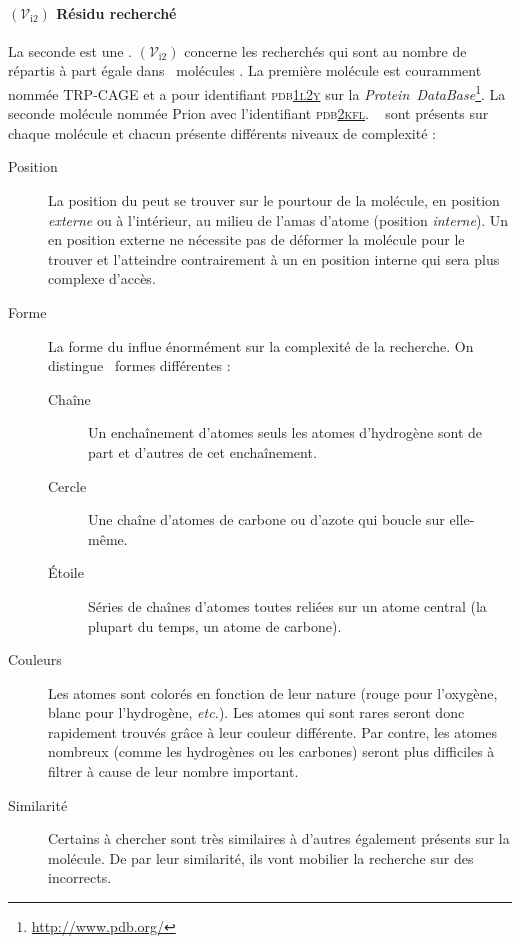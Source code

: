 \documentclass[myfrancais]{mythesis}
\newcommand{\mynum}[1]{\nombre{#1}}
\newcommand{\myvar}[2]{$\left(\mathcal{V}_{\mathrm{#1}#2}\right)$\xspace}
\newcommand{\myvari}[1]{\myvar{i}{#1}}
\newcommand{\myPDB}{\textsc{pdb}\xspace}
\newcommand{\myPDBbase}{\emph{Protein~DataBase}\xspace}
\newcommand{\myPDBlink}[2]{\href{#1}{\textsc{\MakeLowercase{#2}}}}
\newcommand{\TRPCAGE}{TRP-CAGE\xspace}
\newcommand{\Prion}{Prion\xspace}
\newcommand{\myemph}[1]{\emph{#1}}
\newcommand{\myetc}{\textit{etc.}\xspace}
\begin{document}
	\paragraph{\myvari{2} Résidu recherché}
	La seconde  est une .
	\myvari{2} concerne les  recherchés qui sont au nombre de \mynum{10} répartis à part égale dans \mynum{2}~molécules .
	La première molécule est couramment nommée \TRPCAGE {} et a pour identifiant \myPDB \myPDBlink{http://www.rcsb.org/pdb/explore/explore.do?structureId=1L2Y}{1L2Y} sur la \myPDBbase\footnote{\url{http://www.pdb.org/}}.
	La seconde molécule nommée \Prion {} avec l'identifiant \myPDB \myPDBlink{http://www.rcsb.org/pdb/explore/explore.do?structureId=2KFL}{2KFL}.
	\mynum{5}~ sont présents sur chaque molécule  et chacun présente différents niveaux de complexité  :
	\begin{description}
		\item[Position] La position du  peut se trouver sur le pourtour de la molécule, en position \myemph{externe} ou à l'intérieur, au milieu de l'amas d'atome (position \myemph{interne}).
			Un  en position externe ne nécessite pas de déformer la molécule pour le trouver et l'atteindre contrairement à un  en position interne qui sera plus complexe d'accès.
		\item[Forme] La forme du  influe énormément sur la complexité de la recherche.
			On distingue \mynum{3}~formes différentes :
			\begin{description}
				\item[Chaîne] Un enchaînement d'atomes seuls les atomes d'hydrogène sont de part et d'autres de cet enchaînement.
				\item[Cercle] Une chaîne d'atomes de carbone ou d'azote qui boucle sur elle-même.
				\item[Étoile] Séries de chaînes d'atomes toutes reliées sur un atome central (la plupart du temps, un atome de carbone).
			\end{description}
		\item[Couleurs] Les atomes sont colorés en fonction de leur nature (rouge pour l'oxygène, blanc pour l'hydrogène, \myetc).
			Les atomes qui sont rares seront donc rapidement trouvés grâce à leur couleur différente.
			Par contre, les atomes nombreux (comme les hydrogènes ou les carbones) seront plus difficiles à filtrer à cause de leur nombre important.
		\item[Similarité] Certains  à chercher sont très similaires à d'autres  également présents sur la molécule.
			De par leur similarité, ils vont mobilier la recherche sur des  incorrects.
	\end{description}
\end{document}
